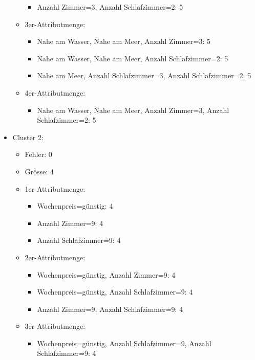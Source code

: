 \begin{itemize}
\begin{itemize}
\begin{itemize}
				\item Anzahl Zimmer=3, Anzahl Schlafzimmer=2: 5
			\end{itemize}
			\item 3er-Attributmenge:
			\begin{itemize}
				\item Nahe am Wasser, Nahe am Meer, Anzahl Zimmer=3: 5
				\item Nahe am Wasser, Nahe am Meer, Anzahl Schlafzimmer=2: 5
				\item Nahe am Meer, Anzahl Schlafzimmer=3, Anzahl Schlafzimmer=2: 5
			\end{itemize}
			\item 4er-Attributmenge:
			\begin{itemize}
				\item Nahe am Wasser, Nahe am Meer, Anzahl Zimmer=3, Anzahl Schlafzimmer=2: 5
			\end{itemize}
	\end{itemize}
	\item Cluster 2:
	\begin{itemize}
		\item Fehler: 0
		\item Grösse: 4
			\item 1er-Attributmenge:
			\begin{itemize}
				\item Wochenpreis=günstig: 4
				\item Anzahl Zimmer=9: 4
				\item Anzahl Schlafzimmer=9: 4
			\end{itemize}
			\item 2er-Attributmenge:
			\begin{itemize}
				\item Wochenpreis=günstig, Anzahl Zimmer=9: 4
				\item Wochenpreis=günstig, Anzahl Schlafzimmer=9: 4
			
				\item Anzahl Zimmer=9, Anzahl Schlafzimmer=9: 4
			\end{itemize}
			\item 3er-Attributmenge:
			\begin{itemize}
				\item Wochenpreis=günstig, Anzahl Schlafzimmer=9, Anzahl Schlafzimmer=9: 4
			\end{itemize}
	\end{itemize}
\end{itemize}


